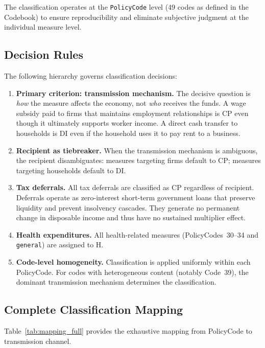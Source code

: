 \documentclass[12pt, a4paper]{article}
\begin{document}
The classification operates at the \texttt{PolicyCode} level (49 codes as defined in the Codebook) to ensure reproducibility and eliminate subjective judgment at the individual measure level.

\subsection{Decision Rules}

The following hierarchy governs classification decisions:

\begin{enumerate}
  \item \textbf{Primary criterion: transmission mechanism.} The decisive question is \textit{how} the measure affects the economy, not \textit{who} receives the funds. A wage subsidy paid to firms that maintains employment relationships is CP even though it ultimately supports worker income. A direct cash transfer to households is DI even if the household uses it to pay rent to a business.
  \item \textbf{Recipient as tiebreaker.} When the transmission mechanism is ambiguous, the recipient disambiguates: measures targeting firms default to CP; measures targeting households default to DI.
  \item \textbf{Tax deferrals.} All tax deferrals are classified as CP regardless of recipient. Deferrals operate as zero-interest short-term government loans that preserve liquidity and prevent insolvency cascades. They generate no permanent change in disposable income and thus have no sustained multiplier effect.
  \item \textbf{Health expenditures.} All health-related measures (PolicyCodes~30--34 and \texttt{general}) are assigned to H.
  \item \textbf{Code-level homogeneity.} Classification is applied uniformly within each PolicyCode. For codes with heterogeneous content (notably Code~39), the dominant transmission mechanism determines the classification.
\end{enumerate}

\subsection{Complete Classification Mapping}

Table~\ref{tab:mapping_full} provides the exhaustive mapping from PolicyCode to transmission channel.
\end{document}
